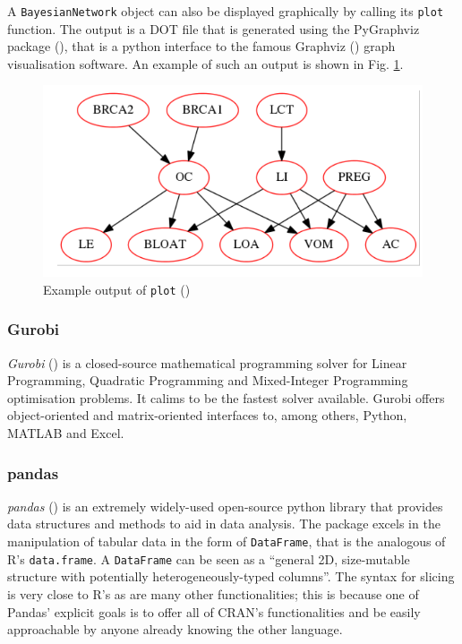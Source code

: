 A \texttt{BayesianNetwork} object can also be displayed graphically by calling its \texttt{plot} function.
The output is a DOT file that is generated using the PyGraphviz package (\cite{pygraphviz}), that is a python interface to the famous Graphviz (\cite{graphviz}) graph visualisation software.
An example of such an output is shown in Fig. \ref{fig:pomegranate_graph_example}.

\begin{figure}[htbp]
\centerline{\includegraphics[width=\columnwidth]{methodology/images/pomegranate_example}}
\caption{Example output of \texttt{plot} (\cite{pomegranatetutorial}) }
\label{fig:pomegranate_graph_example}
\end{figure}

\subsubsection{Gurobi}
\textit{Gurobi} (\cite{gurobi}) is a closed-source mathematical programming solver for Linear Programming, Quadratic Programming and Mixed-Integer Programming optimisation problems.
It calims to be the fastest solver available.
Gurobi offers object-oriented and matrix-oriented interfaces to, among others, Python, MATLAB and Excel.

\subsubsection{pandas}
\textit{pandas} (\cite{pandas}) is an extremely widely-used open-source python library that provides data structures and methods to aid in data analysis.
The package excels in the manipulation of tabular data in the form of \texttt{DataFrame}, that is the analogous of R's \texttt{data.frame}.
A \texttt{DataFrame} can be seen as a \enquote{general 2D, size-mutable structure with potentially heterogeneously-typed columns}.
The syntax for slicing is very close to R's as are many other functionalities; this is because one of Pandas' explicit goals is to offer all of CRAN's functionalities and be easily approachable by anyone already knowing the other language.


